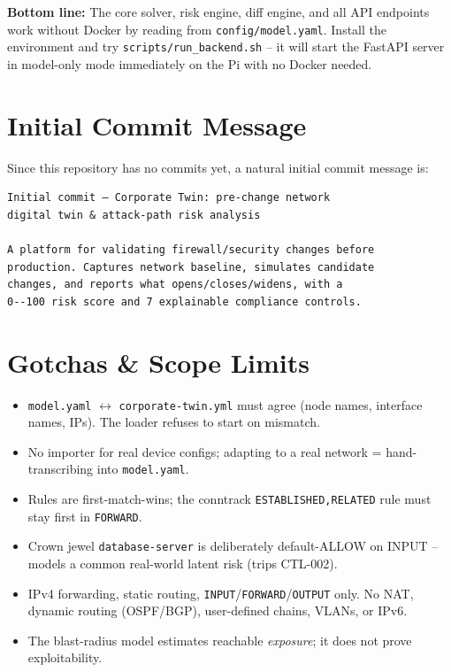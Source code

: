 \documentclass[11pt,a4paper]{article}
\begin{document}
\textbf{Bottom line:} The core solver, risk engine, diff engine, and all API endpoints work
without Docker by reading from \texttt{config/model.yaml}. Install the environment and
try \texttt{scripts/run\_backend.sh} -- it will start the FastAPI server in model-only mode
immediately on the Pi with no Docker needed.

\section{Initial Commit Message}
Since this repository has no commits yet, a natural initial commit message is:

\begin{verbatim}
Initial commit — Corporate Twin: pre-change network
digital twin & attack-path risk analysis

A platform for validating firewall/security changes before
production. Captures network baseline, simulates candidate
changes, and reports what opens/closes/widens, with a
0--100 risk score and 7 explainable compliance controls.
\end{verbatim}

\section{Gotchas \& Scope Limits}
\begin{itemize}
  \item \texttt{model.yaml} $\leftrightarrow$ \texttt{corporate-twin.yml} must agree (node names, interface
        names, IPs). The loader refuses to start on mismatch.
  \item No importer for real device configs; adapting to a real network = hand-transcribing
        into \texttt{model.yaml}.
  \item Rules are first-match-wins; the conntrack \texttt{ESTABLISHED,RELATED} rule must stay
        first in \texttt{FORWARD}.
  \item Crown jewel \texttt{database-server} is deliberately default-ALLOW on INPUT -- models a
        common real-world latent risk (trips CTL-002).
  \item IPv4 forwarding, static routing, \texttt{INPUT}/\texttt{FORWARD}/\texttt{OUTPUT} only.
        No NAT, dynamic routing (OSPF/BGP), user-defined chains, VLANs, or IPv6.
  \item The blast-radius model estimates reachable \emph{exposure}; it does not prove
        exploitability.
\end{itemize}
\end{document}
